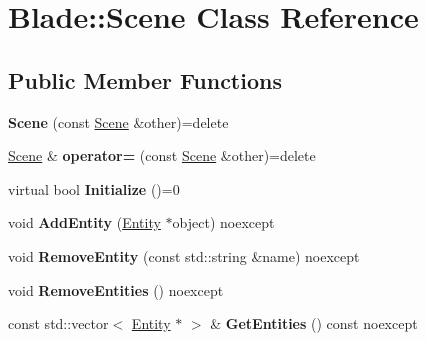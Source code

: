 \hypertarget{class_blade_1_1_scene}{}\section{Blade\+:\+:Scene Class Reference}
\label{class_blade_1_1_scene}
\subsection*{Public Member Functions}
\begin{DoxyCompactItemize}
\item 
\mbox{\label{class_blade_1_1_scene_a80a9bba828a6faf60ca9a91301e6e707}} 
{\bfseries Scene} (const \hyperlink{class_blade_1_1_scene}{Scene} \&other)=delete
\item 
\mbox{\label{class_blade_1_1_scene_ae2d9a202f00b35daf25d8bb7acbb8b16}} 
\hyperlink{class_blade_1_1_scene}{Scene} \& {\bfseries operator=} (const \hyperlink{class_blade_1_1_scene}{Scene} \&other)=delete
\item 
\mbox{\label{class_blade_1_1_scene_a0bd508e8d4ab8db0b91eb8959056bb93}} 
virtual bool {\bfseries Initialize} ()=0
\item 
\mbox{\label{class_blade_1_1_scene_a0f17cd32cb502502fd5a3a39c72b4856}} 
void {\bfseries Add\+Entity} (\hyperlink{class_blade_1_1_entity}{Entity} $\ast$object) noexcept
\item 
\mbox{\label{class_blade_1_1_scene_ae04a504f28ab2c80099863d067cb6914}} 
void {\bfseries Remove\+Entity} (const std\+::string \&name) noexcept
\item 
\mbox{\label{class_blade_1_1_scene_a41c8f3a8a59307c42a17163614ba8dd8}} 
void {\bfseries Remove\+Entities} () noexcept
\item 
\mbox{\label{class_blade_1_1_scene_abd8993ff5deae13c05bfcdffbe9af6ff}} 
const std\+::vector$<$ \hyperlink{class_blade_1_1_entity}{Entity} $\ast$ $>$ \& {\bfseries Get\+Entities} () const noexcept
\item 
\mbox{\label{class_blade_1_1_scene_a4aa00824c68cf68734f85ac465796385}} 

\end{DoxyCompactItemize}
